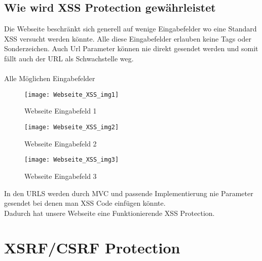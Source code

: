 {\subsection{Wie wird XSS Protection gewährleistet}
\label{sec:xss_prot}
Die Webseite beschränkt sich generell auf wenige Eingabefelder wo eine Standard XSS versucht werden könnte. Alle diese Eingabefelder erlauben keine Tags oder Sonderzeichen. Auch Url Parameter können nie direkt gesendet werden und somit fällt auch der URL als Schwachstelle weg.\\ \\Alle Möglichen Eingabefelder
\begin{figure}[H]
    \texttt{[image: Webseite\_XSS\_img1]}
    \caption{Webseite Eingabefeld 1}
    \label{fig:webxxs1}
\end{figure}
\begin{figure}[H]
    \texttt{[image: Webseite\_XSS\_img2]}
    \caption{Webseite Eingabefeld 2}
    \label{fig:webxxs1}
\end{figure}
\begin{figure}[H]
    \texttt{[image: Webseite\_XSS\_img3]}
    \caption{Webseite Eingabefeld 3}
    \label{fig:webxxs1}
\end{figure}
In den URLS werden durch MVC und passende Implementierung nie Parameter gesendet bei denen man XSS Code einfügen könnte.\\
Dadurch hat unsere Webseite eine Funktionierende XSS Protection.
\section{XSRF/CSRF Protection}
\label{sec:csrf}
}

